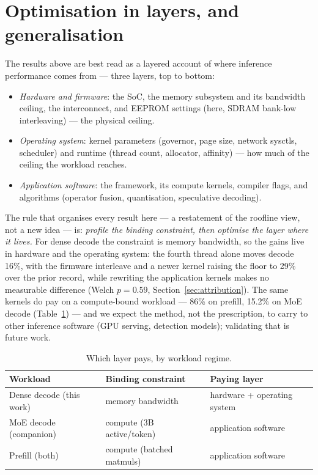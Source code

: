 \documentclass[10pt,a4paper]{article}
\begin{document}
\section{Optimisation in layers, and generalisation}
\label{sec:layers}
The results above are best read as a layered account of where inference performance comes from --- three layers, top to bottom:
\begin{itemize}
  \item \emph{Hardware and firmware}: the SoC, the memory subsystem and its bandwidth ceiling, the interconnect, and EEPROM settings (here, SDRAM bank-low interleaving) --- the physical ceiling.
  \item \emph{Operating system}: kernel parameters (governor, page size, network sysctls, scheduler) and runtime (thread count, allocator, affinity) --- how much of the ceiling the workload reaches.
  \item \emph{Application software}: the framework, its compute kernels, compiler flags, and algorithms (operator fusion, quantisation, speculative decoding).
\end{itemize}

The rule that organises every result here --- a restatement of the roofline view, not a new idea --- is: \emph{profile the binding constraint, then optimise the layer where it lives.} For dense decode the constraint is memory bandwidth, so the gains live in hardware and the operating system: the fourth thread alone moves decode 16\%, with the firmware interleave and a newer kernel raising the floor to 29\% over the prior record, while rewriting the application kernels makes no measurable difference (Welch $p{=}0.59$, Section~\ref{sec:attribution}). The same kernels do pay on a compute-bound workload --- 86\% on prefill, 15.2\% on MoE decode (Table~\ref{tab:layermap}) --- and we expect the method, not the prescription, to carry to other inference software (GPU serving, detection models); validating that is future work.

\begin{table}[H]
\centering\small
\caption{Which layer pays, by workload regime.}
\label{tab:layermap}
\begin{tabularx}{\textwidth}{p{4.4cm}XX}
\toprule
\textbf{Workload} & \textbf{Binding constraint} & \textbf{Paying layer} \\
\midrule
Dense decode (this work) & memory bandwidth & hardware + operating system \\
MoE decode (companion) & compute (3B active/token) & application software \\
Prefill (both) & compute (batched matmuls) & application software \\
\bottomrule
\end{tabularx}
\end{table}
\end{document}
